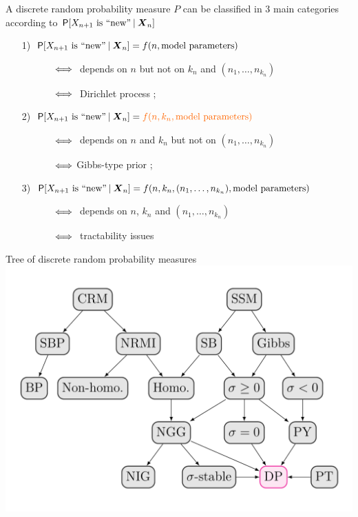 A discrete random probability measure $P$ can be classified in 3 main categories according to $\mathsf{P}[X_{n+1}\hbox{ is ``new''} \: |\: \boldsymbol{X}_{n}]$
    \begin{itemize}
    \item[1)] $\mathsf{P}[X_{n+1}\hbox{ is ``new''} \: |\: \boldsymbol{X}_{n}]=f(n, \hbox{model parameters})$

     $ \hspace{1.2cm} \Longleftrightarrow \ $ depends on $n$ but not on $k_{n}$ and $(n_{1},\ldots,n_{k_{n}})$

     $ \hspace{1.2cm} \Longleftrightarrow \ $ Dirichlet process \citep{ferguson1973bayesian};\\[4pt]
     
    \smallskip

    \item[2)] $\mathsf{P}[X_{n+1}\hbox{ is ``new''} \: |\: \boldsymbol{X}_{n}]=\textcolor{red2}{f(n, k_{n}, \hbox{model parameters})}$

    $ \hspace{1.2cm} \Longleftrightarrow \ $ depends on $n$ and $k_{n}$  but not on $(n_{1},\ldots,n_{k_{n}})$

    $ \hspace{1.2cm} \Longleftrightarrow \ $\textcolor{red2}{Gibbs-type prior} \citep{pitman2003poisson};\\[4pt]

\smallskip

    \item[3)] $\mathsf{P}[X_{n+1}\hbox{ is ``new''} \: |\: \boldsymbol{X}_{n}]=f(n, k_{n}, (n_{1},\ldots,n_{k_{n}}), \hbox{model parameters})$

    $ \hspace{1.2cm} \Longleftrightarrow \ $ depends on  $n$, $k_{n}$ and $(n_{1},\ldots,n_{k_{n}})$
    
    $ \hspace{1.2cm} \Longleftrightarrow \ $ tractability issues
    
 \end{itemize}



{Tree of discrete random probability measures}
\includegraphics[width=\textwidth]{figures_julyan/introRPM/graph_model}



